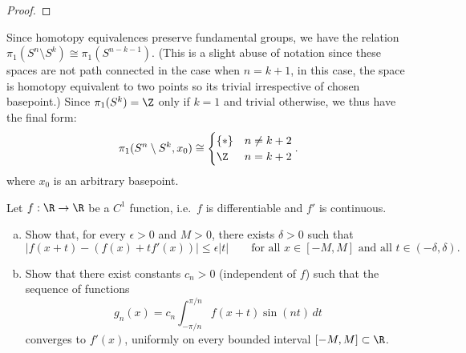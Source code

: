 \documentclass[11pt,letterpaper]{article}
\begin{document}
\begin{solution}
\begin{proof}
    \end{proof}
    Since homotopy equivalences preserve fundamental groups, we have the relation $\pi_1(S^n\setminus S^k)\cong \pi_1(S^{n-k-1})$. (This is a slight abuse of notation since these spaces are not path connected in the case when $n=k+1$, in this case, the space is homotopy equivalent to two points so its trivial irrespective of chosen basepoint.) Since $\pi_1(S^k)=\Z$ only if $k=1$ and trivial otherwise, we thus have the final form:
    \[
        \pi_1(S^n\setminus S^k, x_0) \cong \begin{cases}
            \{*\} & n \neq k+2\\
            \Z & n=k+2\\
        \end{cases}.
    \] 
    where $x_0$ is an arbitrary basepoint.
\end{solution}

\begin{problem}
    Let $f:\R\to \R$ be a $C^1$ function, i.e.\ $f$ is differentiable and $f'$ is continuous. 
    \begin{enumerate}[(a)]
        \item Show that, for every $\epsilon>0$ and $M>0$, there exists $\delta>0$ such that $$|f(x+t)-(f(x)+tf'(x))|\leq \epsilon |t|\qquad \text{for all $x\in [-M,M]$ and all $t\in (-\delta,\delta)$.}$$
        \item Show that there exist constants $c_n>0$ (independent of $f$) such that the sequence of functions $$g_n(x)=c_n \int_{-\pi/n}^{\pi/n} f(x+t)\sin(nt)\,dt$$ converges to $f'(x)$, uniformly on every bounded interval $[-M,M]\subset \R$.
    \end{enumerate}
\end{problem}
\end{document}
